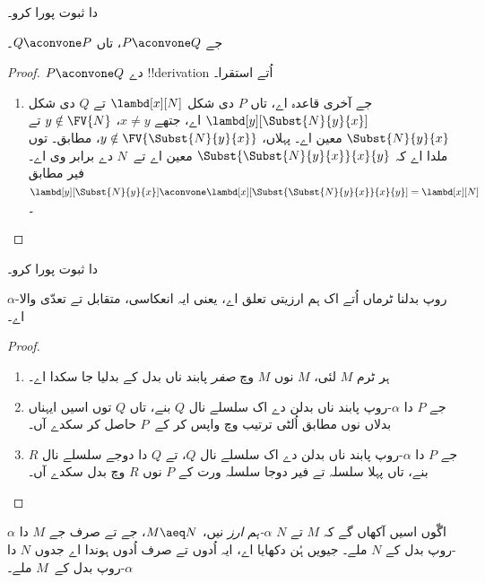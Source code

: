 \documentclass[../../../include/open-logic-section]{subfiles}
\begin{document}
\begin{prob}
   دا ثبوت پورا کرو۔
\end{prob}

\begin{lem}
  جے $P \aconvone Q$، تاں $Q \aconvone P$۔
\end{lem}

\begin{proof}
  $P \aconvone Q$ دے !!{derivation} اُتے استقرا۔
  \begin{enumerate}
  \item جے آخری قاعدہ  اے، تاں $P$ دی
    شکل $\lambd[x][N]$ تے $Q$ دی شکل
    $\lambd[y][\Subst{N}{y}{x}]$ اے، جتھے $x \neq y$، $y \notin \FV{N}$
    تے $\Subst{N}{y}{x}$ معین اے۔ پہلاں، $y \notin
    \FV{\Subst{N}{y}{x}}$،  مطابق۔
     توں ملدا اے کہ $\Subst{\Subst{N}{y}{x}}{x}{y}$
    معین اے تے~$N$ دے برابر وی اے۔ فیر 
    مطابق $\lambd[y][\Subst{N}{y}{x}]
    \aconvone \lambd[x][\Subst{\Subst{N}{y}{x}}{x}{y}] =
    \lambd[x][N]$۔
  \end{enumerate}
\end{proof}

\begin{prob}
   دا ثبوت پورا کرو۔
\end{prob}

\begin{thm}
  $\alpha$-روپ بدلنا ٹرماں اُتے اک ہم ارزیتی تعلق اے، یعنی
  ایہ انعکاسی، متقابل تے تعدّی والا اے۔
\end{thm}

\begin{proof}
  \begin{enumerate}
  \item ہر ٹرم $M$ لئی، $M$ نوں $M$ وچ \emph{صفر} پابند ناں بدل کے
    بدلیا جا سکدا اے۔
  \item جے $P$ دا $\alpha$-روپ پابند ناں بدلن دے اک سلسلے نال
    $Q$ بنے، تاں $Q$ توں اسیں ایہناں بدلاں نوں
     مطابق اُلٹی ترتیب وچ واپس کر کے~$P$ حاصل
    کر سکدے آں۔
  \item جے $P$ دا $\alpha$-روپ پابند ناں بدلن دے اک سلسلے نال
    $Q$، تے $Q$ دا دوجے سلسلے نال $R$ بنے، تاں پہلا سلسلہ
    تے فیر دوجا سلسلہ ورت کے $P$ نوں $R$ وچ بدل سکدے آں۔
  \end{enumerate}
\end{proof}

اگّوں اسیں آکھاں گے کہ $M$ تے $N$ \emph{$\alpha$-ہم ارز}
نیں، $M
\aeq N$، جے تے صرف جے $M$ دا $\alpha$-روپ بدل کے $N$ ملے۔
جیویں ہُن دکھایا اے، ایہ اُدوں تے صرف اُدوں ہوندا اے جدوں $N$
دا $\alpha$-روپ بدل کے~$M$ ملے۔
\end{document}

